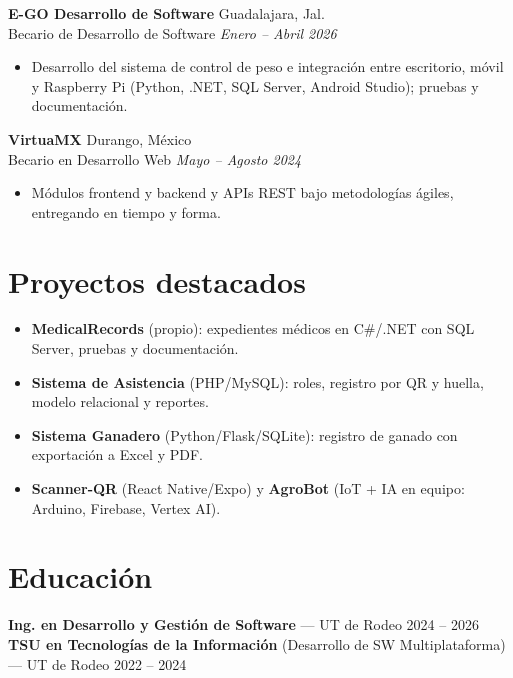 \documentclass[10pt,a4paper]{article}
\newcommand{\entry}[4]{%
  \textbf{#1} \hfill {\color{muted}\small #2}\\[0pt]
  {\color{accent}\small #3} \hfill {\color{muted}\itshape\small #4}\\[1pt]
}
\begin{document}
\entry{E-GO Desarrollo de Software}{Guadalajara, Jal.}{Becario de Desarrollo de Software}{Enero -- Abril 2026}
\begin{itemize}
  \item Desarrollo del sistema de control de peso e integración entre escritorio, móvil y Raspberry Pi (Python, .NET, SQL Server, Android Studio); pruebas y documentación.
\end{itemize}

\entry{VirtuaMX}{Durango, México}{Becario en Desarrollo Web}{Mayo -- Agosto 2024}
\begin{itemize}
  \item Módulos frontend y backend y APIs REST bajo metodologías ágiles, entregando en tiempo y forma.
\end{itemize}

\section{Proyectos destacados}
\begin{itemize}
  \item \textbf{MedicalRecords} (propio): expedientes médicos en C\#/.NET con SQL Server, pruebas y documentación.
  \item \textbf{Sistema de Asistencia} (PHP/MySQL): roles, registro por QR y huella, modelo relacional y reportes.
  \item \textbf{Sistema Ganadero} (Python/Flask/SQLite): registro de ganado con exportación a Excel y PDF.
  \item \textbf{Scanner-QR} (React Native/Expo) y \textbf{AgroBot} (IoT + IA en equipo: Arduino, Firebase, Vertex AI).
\end{itemize}

\section{Educación}
\textbf{Ing. en Desarrollo y Gestión de Software} --- UT de Rodeo \hfill {\color{muted}\small 2024 -- 2026}\\[1pt]
\textbf{TSU en Tecnologías de la Información} (Desarrollo de SW Multiplataforma) --- UT de Rodeo \hfill {\color{muted}\small 2022 -- 2024}

\end{document}
